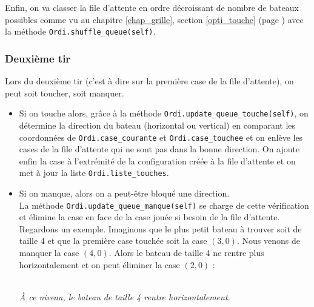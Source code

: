 \medskip

 Enfin, on va classer la file d'attente en ordre décroissant de nombre de bateaux possibles comme vu au chapitre \ref{chap_grille}, section \ref{opti_touche} (page \pageref{opti_touche}) avec la méthode \texttt{Ordi.shuffle\_queue(self)}.

\subsubsection{Deuxième tir}
Lors du deuxième tir (c'est à dire sur la première case de la file d'attente), on peut soit toucher, soit manquer.
\begin{itemize}
\item Si on touche alors, grâce à la méthode \texttt{Ordi.update\_queue\_touche(self)}, on détermine la direction du bateau (horizontal ou vertical) en comparant les coordonnées de \texttt{Ordi.case\_courante} et \texttt{Ordi.case\_touchee} et on enlève les cases de la file d'attente qui ne sont pas dans la bonne direction. On ajoute enfin la case à l'extrémité de la configuration créée à la file d'attente et on met à jour la liste \texttt{Ordi.liste\_touches}. 
\item Si on manque, alors on a peut-être bloqué une direction.\\
La méthode \texttt{Ordi.update\_queue\_manque(self)} se charge de cette vérification et élimine la case en face de la case jouée si besoin de la file d'attente.\\
Regardons un exemple. Imaginons que le plus petit bateau à trouver soit de taille 4 et que la première case touchée soit la case $(3,0)$. Nous venons de manquer la case $(4,0)$. Alors le bateau de taille 4 ne rentre plus horizontalement et on peut éliminer la case $(2,0)$ :

\begin{center}
\\
\textit{À ce niveau, le bateau de taille 4 rentre horizontalement.}
\end{center}
\medskip
\begin{center}
\end{center}
\end{itemize}
